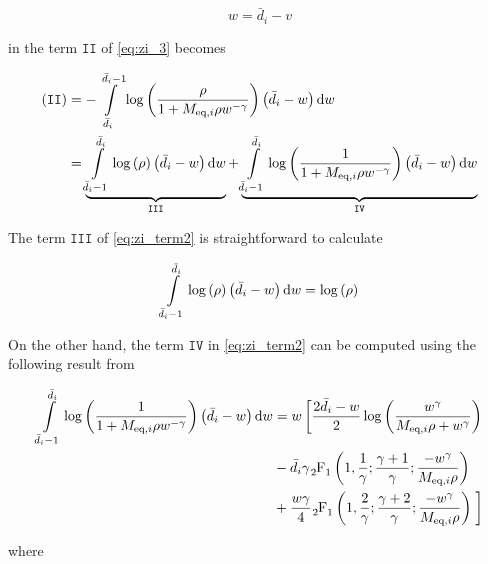 \begin{equation} \label{eq:change_variable_2}
    w = \bar{d}_i - v
\end{equation}

\noindent
in the term $\mathtt{II}$ of \eqref{eq:zi_3} becomes

\begin{equation} \label{eq:zi_term2}
\begin{aligned}
    \mathtt{(II)} &= -\int\limits_{\bar{d}_i}^{\bar{d}_i -1}
    \log\left(\frac{\rho}{1 + M_{\text{eq},i}\rho w^{-\gamma}}\right)\left(\bar{d}_i - w
    \right)\text{d} w\\
    &=\underbrace{\int\limits_{\bar{d}_i-1}^{\bar{d}_i}\log\left(\rho\right)
    \left(\bar{d}_i-w\right)\text{d} w}_{\mathtt{III}} +
    \underbrace{\int\limits_{\bar{d}_i-1}^{\bar{d}_i}\log\left(\frac{1}
    {1 + M_{\text{eq},i}\rho w^{-\gamma}}\right)\left(\bar{d}_i - w\right)\text{d} w}_
    {\mathtt{IV}}
\end{aligned}
\end{equation}

The term $\mathtt{III}$ of \eqref{eq:zi_term2} is straightforward to calculate

\begin{equation} \label{eq:zi_term3}
    \int\limits_{\bar{d}_i-1}^{\bar{d}_i}\log\left(\rho\right)
    \left(\bar{d}_i-w\right)\text{d} w = \log\left(\rho\right)
\end{equation}

On the other hand, the term $\mathtt{IV}$ in \eqref{eq:zi_term2} can be computed
using the following result from \cite{Wolfram}

\begin{equation} \label{eq:zi_term4}
\begin{aligned}
    \int\limits_{\bar{d}_i-1}^{\bar{d}_i}\log\left(\frac{1}
    {1 + \Meqi\rho w^{-\gamma}}\right)\left(\bar{d}_i - w\right)\dee w &= w\left[\vphantom{\frac{1}{1}}
    \frac{2\bar{d}_i-w}{2}\log\left(\frac{w^{\gamma}}
    {\Meqi\rho + w^{\gamma}}\right)\right.\\
    &-\bar{d}_i\gamma \hgeo\left(1,\frac{1}{\gamma};\frac{\gamma+1}{\gamma};
    \frac{-w^{\gamma}}{\Meqi\rho}\right)\\
    &+\frac{w\gamma}{4}\hgeo\left(1,\frac{2}{\gamma};\frac{\gamma+2}{\gamma};
    \frac{-w^{\gamma}}{\Meqi\rho}\right)
    \left.\vphantom{\frac{1^2}{1}}\right]
\end{aligned}
\end{equation}

\noindent
where

